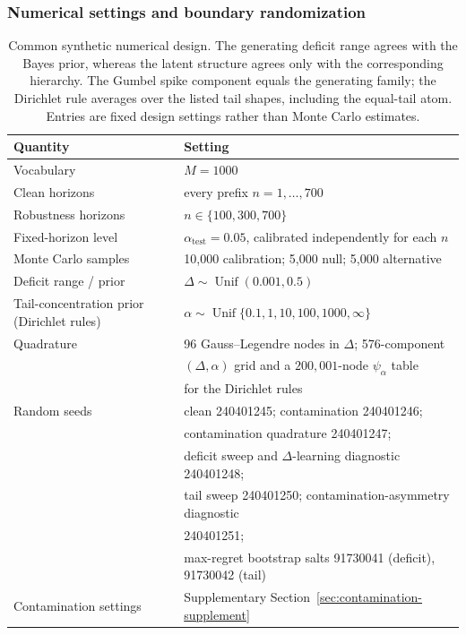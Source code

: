 \documentclass[11pt]{article}
\newcommand{\Unif}{\operatorname{Unif}}
\begin{document}
\subsubsection{Numerical settings and boundary randomization}
\label{sec:synthetic-design-details}

\begin{table}[htbp]
\centering
\caption{Common synthetic numerical design.  The generating deficit range agrees with the Bayes prior, whereas the latent structure agrees only with the corresponding hierarchy.  The Gumbel spike component equals the generating family; the Dirichlet rule averages over the listed tail shapes, including the equal-tail atom.  Entries are fixed design settings rather than Monte Carlo estimates.}
\label{tab:design}
\begin{tabular}{@{}ll@{}}
\toprule
Quantity & Setting \\
\midrule
Vocabulary & $M=1000$ \\
Clean horizons & every prefix $n=1,\ldots,700$ \\
Robustness horizons & $n\in\{100,300,700\}$ \\
Fixed-horizon level & $\alpha_{\mathrm{test}}=0.05$, calibrated independently for each $n$ \\
Monte Carlo samples & 10,000 calibration; 5,000 null; 5,000 alternative \\
Deficit range / prior & $\Delta\sim\Unif(0.001,0.5)$ \\
Tail-concentration prior (Dirichlet rules) & $\alpha\sim\Unif\{0.1,1,10,100,1000,\infty\}$ \\
Quadrature & 96 Gauss--Legendre nodes in $\Delta$; 576-component \\
 & $(\Delta,\alpha)$ grid and a $200{,}001$-node $\psi_\alpha$ table \\
 & for the Dirichlet rules \\
Random seeds & clean 240401245; contamination 240401246; \\
 & contamination quadrature 240401247; \\
 & deficit sweep and $\Delta$-learning diagnostic 240401248; \\
 & tail sweep 240401250; contamination-asymmetry diagnostic \\
 & 240401251; \\
 & max-regret bootstrap salts 91730041 (deficit), 91730042 (tail) \\
Contamination settings & Supplementary Section~\ref{sec:contamination-supplement} \\
\bottomrule
\end{tabular}
\end{table}
\end{document}
